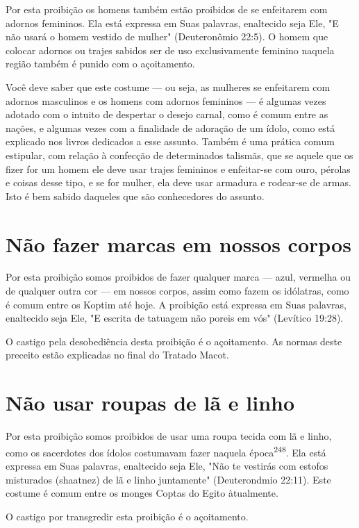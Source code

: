 \begin{itemize}
\begin{enumrate}
\begin{itemize}
\begin{itemize}
\begin{itemize}
Por esta proibição os homens também estão proibidos de se enfeita­rem
com adornos femininos. Ela está expressa em Suas palavras, enaltecido
se­ja Ele, "E não usará o homem vestido de mulher" (Deuteronômio 22:5).
O ho­mem que colocar adornos ou trajes sabidos ser de uso exclusivamente
femini­no naquela região também é punido com o açoitamento.

Você deve saber que este costume --- ou seja, as mulheres se enfeita­rem
com adornos masculinos e os homens com adornos femininos --- é algu­mas
vezes adotado com o intuito de despertar o desejo carnal, como é comum
entre as nações, e algumas vezes com a finalidade de adoração de um
ídolo, como está explicado nos livros dedicados a esse assunto. Também é
uma práti­ca comum estipular, com relação à confecção de determinados
talismãs, que se aquele que os fizer for um homem ele deve usar trajes
femininos e enfeitar-se com ouro, pérolas e coisas desse tipo, e se for
mulher, ela deve usar armadu­ra e rodear-se de armas. Isto é bem sabido
daqueles que são conhecedores do assunto.

\section{Não fazer marcas em nossos corpos}

Por esta proibição somos proibidos de fazer qualquer marca --- azul,
vermelha ou de qualquer outra cor --- em nossos corpos, assim como fazem
os idólatras, como é comum entre os Koptim até hoje. A proibição está
expres­sa em Suas palavras, enaltecido seja Ele, "E escrita de tatuagem
não poreis em vós" (Levítico 19:28).

O castigo pela desobediência desta proibição é o açoitamento. As normas
deste preceito estão explicadas no final do Tratado Macot.


\section{Não usar roupas de lã e linho}


Por esta proibição somos proibidos de usar uma roupa tecida com lã e
linho, como os sacerdotes dos ídolos costumavam fazer naquela
época\textsuperscript{248}. Ela está expressa em Suas palavras,
enaltecido seja Ele, "Não te vestirás com estofos misturados (shaatnez)
de lã e linho juntamente" (Deuterondmio 22:11). Este costume é comum
entre os monges Coptas do Egito àtualmente.

O castigo por transgredir esta proibição é o açoitamento.


\end{itemize}
\end{itemize}
\end{itemize}
\end{enumrate}
\end{itemize}
